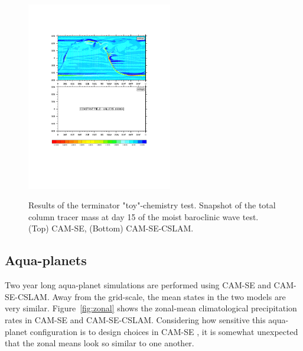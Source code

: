 \documentclass[twocol]{ametsoc}
\begin{document}
\begin{figure}[t]
\noindent\includegraphics[width=15pc,angle=0]{figs/terminator_iCLy.pdf}\\
\caption{Results of the terminator "toy"-chemistry test. Snapshot of the total column tracer mass at day 15 of the moist baroclinic wave test. (Top) CAM-SE, (Bottom) CAM-SE-CSLAM.}
\label{fig:term}
\end{figure}

\subsection{{\color{red}Aqua-planets{}}}

{\color{red}Two year long aqua-planet simulations are performed using CAM-SE and CAM-SE-CSLAM. Away from the grid-scale, the mean states in the two models are very similar. Figure~\ref{fig:zonal} shows the zonal-mean climatological precipitation rates in CAM-SE and CAM-SE-CSLAM. Considering how sensitive this aqua-planet configuration is to design choices in CAM-SE \citep{LetAl2018JAMES}, it is somewhat unexpected that the zonal means look so similar to one another.{}} 
\end{document}
